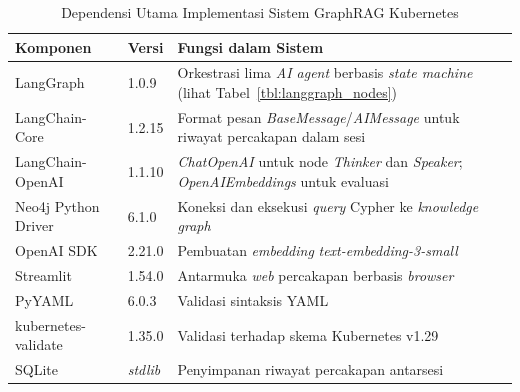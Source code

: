﻿\renewcommand{\arraystretch}{1.1}
\captionsetup[table]{justification=raggedright,singlelinecheck=false}
\begin{table}[htbp]
\caption{Dependensi Utama Implementasi Sistem GraphRAG Kubernetes}
\label{tbl:tech_stack}
\centering
\begin{tabular}{| p{} | p{} | p{} |}
\hline
\textbf{Komponen} & \textbf{Versi} & \textbf{Fungsi dalam Sistem} \\
\hline
LangGraph & 1.0.9 & Orkestrasi lima \textit{AI agent} berbasis \textit{state machine} (lihat Tabel~\ref{tbl:langgraph_nodes}) \\
\hline
LangChain-Core & 1.2.15 & Format pesan \textit{BaseMessage}/\textit{AIMessage} untuk riwayat percakapan dalam sesi \\
\hline
LangChain-OpenAI & 1.1.10 & \textit{ChatOpenAI} untuk node \textit{Thinker} dan \textit{Speaker}; \textit{OpenAIEmbeddings} untuk evaluasi \\
\hline
Neo4j Python Driver & 6.1.0 & Koneksi dan eksekusi \textit{query} Cypher ke \textit{knowledge graph} \\
\hline
OpenAI SDK & 2.21.0 & Pembuatan \textit{embedding} \textit{text-embedding-3-small} \\
\hline
Streamlit & 1.54.0 & Antarmuka \textit{web} percakapan berbasis \textit{browser} \\
\hline
PyYAML & 6.0.3 & Validasi sintaksis YAML \\
\hline
kubernetes-validate & 1.35.0 & Validasi terhadap skema Kubernetes v1.29 \\
\hline
SQLite & \textit{stdlib} & Penyimpanan riwayat percakapan antarsesi \\
\hline
\end{tabular}
\end{table}
